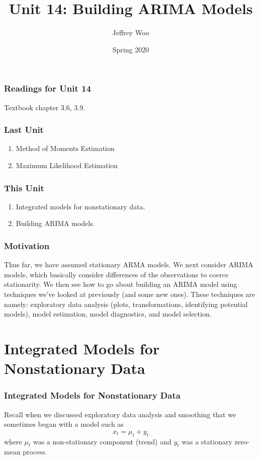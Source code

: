 \documentclass[%
xcolor=pdftex]{beamer}
\title{Unit 14: Building ARIMA Models}
\author[STAT 5170: Applied Time Series, Unit 14]{Jeffrey Woo}
\institute{Department of Statistics, University of Virginia}
\date{Spring 2020}
\begin{document}
\frame{\titlepage}


\begin{frame}
\frametitle{Readings for Unit 14}

Textbook chapter 3.6, 3.9.

\end{frame}



\begin{frame}
\frametitle{Last Unit}
\begin{enumerate}
\item Method of Moments Estimation
\item Maximum Likelihood Estimation
\end{enumerate}
\end{frame}

\begin{frame}
\frametitle{This Unit}
\begin{enumerate}
\item Integrated models for nonstationary data.
\item Building ARIMA models.
\end{enumerate}
\end{frame}


\begin{frame}
\frametitle{Motivation}

Thus far, we have assumed stationary ARMA models. We next consider ARIMA models, which basically consider differences of the observations to coerce stationarity. We then see how to go about building an ARIMA model using techniques we've looked at previously (and some new ones). These techniques are namely: exploratory data analysis (plots, transformations, identifying potential models), model estimation, model diagnostics, and model selection.

\end{frame}

\section{Integrated Models for Nonstationary Data}
\frame{\tableofcontents[currentsection]}

\begin{frame}
\frametitle{Integrated Models for Nonstationary Data}

Recall when we discussed exploratory data analysis and smoothing that we sometimes began with a model such as
 $$
 x_t=\mu_t + y_t
 $$
where $\mu_t$ was a non-stationary component (trend) and $y_t$ was a stationary zero-mean process.

\end{frame}
\end{document}
